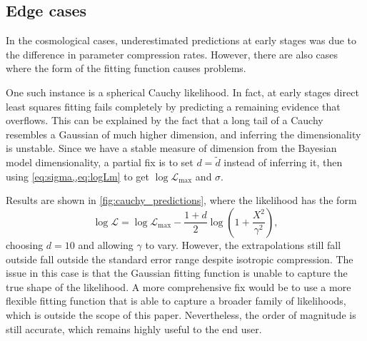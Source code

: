 \documentclass[usenatbib]{mnras}
\begin{document}
\subsection{Edge cases}\label{subsec:toy_examples}
In the cosmological cases, underestimated predictions at early stages was due to the difference in parameter compression rates. However, there are also cases where the form of the fitting function causes problems.
\par
One such instance is a spherical Cauchy likelihood. In fact, at early stages direct least squares fitting fails completely by predicting a remaining evidence that overflows. This can be explained by the fact that a long tail of a Cauchy resembles a Gaussian of much higher dimension, and inferring the dimensionality is unstable. Since we have a stable measure of dimension from the Bayesian model dimensionality, a partial fix is to set $d = \tilde{d}$ instead of inferring it, then using \cref{eq:sigma,,eq:logLm} to get $\log\mathcal{L}_\mathrm{max}$ and $\sigma$.
\par
Results are shown in \cref{fig:cauchy_predictions}, where the likelihood has the form
\begin{equation}
	\log\mathcal{L} = \log\mathcal{L}_\mathrm{max} - \frac{1 + d}{2} \log \left(1 + \frac{X^2}{\gamma^2}\right),
\end{equation}
choosing $d = 10$ and allowing $\gamma$ to vary. However, the extrapolations still fall outside fall outside the standard error range despite isotropic compression. The issue in this case is that the Gaussian fitting function is unable to capture the true shape of the likelihood. A more comprehensive fix would be to use a more flexible fitting function that is able to capture a broader family of likelihoods, which is outside the scope of this paper. Nevertheless, the order of magnitude is still accurate, which remains highly useful to the end user. 
\end{document}
